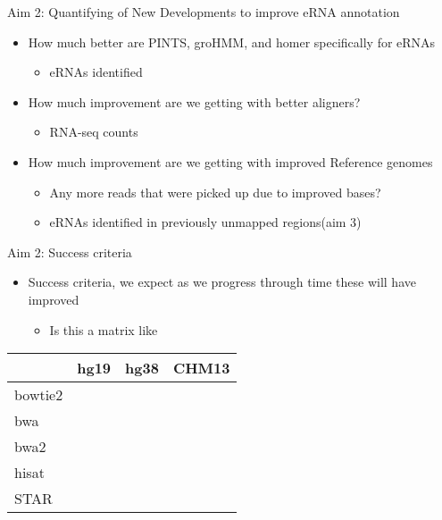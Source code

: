 \documentclass[bigger]{beamer}
\begin{document}
\begin{frame}[label={sec:orgd040bde}]{Aim 2: Quantifying of New Developments to improve eRNA annotation}
\begin{itemize}
\item How much better are PINTS, groHMM, and homer specifically for eRNAs
\begin{itemize}
\item eRNAs identified
\end{itemize}

\item How much improvement are we getting with better aligners?
\begin{itemize}
\item RNA-seq counts
\end{itemize}

\item How much improvement are we getting with improved Reference genomes
\begin{itemize}
\item Any more reads that were picked up due to improved bases?
\item eRNAs identified in previously unmapped regions(aim 3)
\end{itemize}
\end{itemize}
\end{frame}


\begin{frame}[label={sec:org0100573}]{Aim 2: Success criteria}
\begin{itemize}
\item Success criteria, we expect as we progress through time these will have improved
\begin{itemize}
\item Is this a matrix like
\end{itemize}
\end{itemize}
\begin{center}
\begin{tabular}{llll}
 & hg19 & hg38 & CHM13\\[0pt]
\hline
bowtie2 &  &  & \\[0pt]
bwa &  &  & \\[0pt]
bwa2 &  &  & \\[0pt]
hisat &  &  & \\[0pt]
STAR &  &  & \\[0pt]
\end{tabular}
\end{center}
\end{frame}
\end{document}

